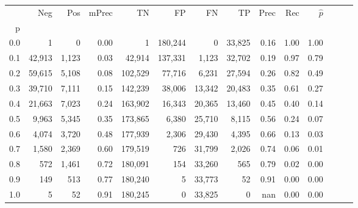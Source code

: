 \begin{tabular}{rrrrrrrrrrrrrr}
\toprule
{} &     Neg &    Pos & mPrec &       TN &       FP &      FN &      TP &  Prec &   Rec & $\hat{p}$ \\
p   &         &        &       &          &          &         &         &       &       &           \\
\midrule
0.0 &       1 &      0 &  0.00 &        1 &  180,244 &       0 &  33,825 &  0.16 &  1.00 &      1.00 \\
0.1 &  42,913 &  1,123 &  0.03 &   42,914 &  137,331 &   1,123 &  32,702 &  0.19 &  0.97 &      0.79 \\
0.2 &  59,615 &  5,108 &  0.08 &  102,529 &   77,716 &   6,231 &  27,594 &  0.26 &  0.82 &      0.49 \\
0.3 &  39,710 &  7,111 &  0.15 &  142,239 &   38,006 &  13,342 &  20,483 &  0.35 &  0.61 &      0.27 \\
0.4 &  21,663 &  7,023 &  0.24 &  163,902 &   16,343 &  20,365 &  13,460 &  0.45 &  0.40 &      0.14 \\
0.5 &   9,963 &  5,345 &  0.35 &  173,865 &    6,380 &  25,710 &   8,115 &  0.56 &  0.24 &      0.07 \\
0.6 &   4,074 &  3,720 &  0.48 &  177,939 &    2,306 &  29,430 &   4,395 &  0.66 &  0.13 &      0.03 \\
0.7 &   1,580 &  2,369 &  0.60 &  179,519 &      726 &  31,799 &   2,026 &  0.74 &  0.06 &      0.01 \\
0.8 &     572 &  1,461 &  0.72 &  180,091 &      154 &  33,260 &     565 &  0.79 &  0.02 &      0.00 \\
0.9 &     149 &    513 &  0.77 &  180,240 &        5 &  33,773 &      52 &  0.91 &  0.00 &      0.00 \\
1.0 &       5 &     52 &  0.91 &  180,245 &        0 &  33,825 &       0 &   nan &  0.00 &      0.00 \\
\bottomrule
\end{tabular}
